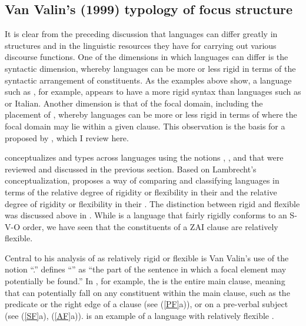 \subsection{Van Valin's (1999) typology of focus structure}

It is clear from the preceding discussion that languages can differ greatly in  structures and in the linguistic resources they have for carrying out various discourse functions. One of the dimensions in which languages can differ is the syntactic dimension, whereby languages can be more or less rigid in terms of the syntactic arrangement of constituents. As the examples above show, a language such as , for example, appears to have a more rigid syntax than languages such as  or Italian. Another dimension is that of the focal domain, including the placement of , whereby languages can be more or less rigid in terms of where the focal domain may lie within a given clause. This observation is the basis for a  proposed by \citet{vanvalin1999}, which I review here. 

\citet{lambrecht1994} conceptualizes  and  types across languages using the notions , , and  that were reviewed and discussed in the previous section. Based on Lambrecht's conceptualization, \citet{vanvalin1999} proposes a way of comparing and classifying languages in terms of the relative degree of rigidity or flexibility in their  and the relative degree of rigidity or flexibility in their . The distinction between rigid and flexible  was discussed above in . While  is a language that fairly rigidly conforms to an S-V-O order, we have seen that the constituents of a ZAI clause are relatively flexible.

Central to his analysis of  as relatively rigid or flexible is Van Valin's use of the notion ``.'' \citet[513]{vanvalin1999} defines ``'' as ``the part of the sentence in which a focal element may potentially be found.'' In , for example, the  is the entire main clause, meaning that  can potentially fall on any constituent within the main clause, such as the predicate or the right edge of a clause (see (\ref{PF}a)), or on a pre-verbal subject (see (\ref{SF}a), (\ref{AF}a)).  is an example of a language with relatively flexible . 

